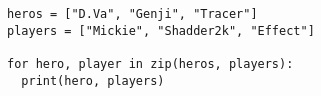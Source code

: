 \documentclass[autodetect-engine,dvipdfmx-if-dvi,a4paper,ja=standard,12pt]{bxjsarticle}
\begin{document}
\begin{verbatim}
heros = ["D.Va", "Genji", "Tracer"]
players = ["Mickie", "Shadder2k", "Effect"]

for hero, player in zip(heros, players):
  print(hero, players)
\end{verbatim}

\printbibliography[title=参考文献]
\end{document}
